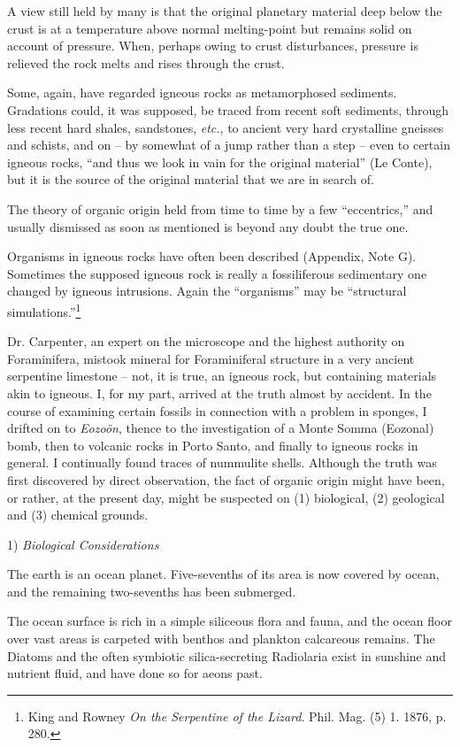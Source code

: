 \documentclass[a4paper, 12pt, oneside]{article}
\begin{document}
A view still held by many is that the original planetary material deep below the crust is at a temperature above normal melting-point but remains solid on account of pressure. When, perhaps owing to crust disturbances, pressure is relieved the rock melts and rises through the crust.

Some, again, have regarded igneous rocks as metamorphosed sediments. Gradations could, it was supposed, be traced from recent soft sediments, through less recent hard shales, sandstones, \emph{etc.}, to ancient very hard crystalline gneisses and schists, and on -- by somewhat of a jump rather than a step -- even to certain igneous rocks, ``and thus we look in vain for the original material'' (Le Conte), but it is the source of the original material that we are in search of.

The theory of organic origin held from time to time by a few ``eccentrics,'' and usually dismissed as soon as mentioned is beyond any doubt the true one.

Organisms in igneous rocks have often been described (Appendix, Note G). Sometimes the supposed igneous rock is really a fossiliferous sedimentary one changed by igneous intrusions. Again the ``organisms'' may be ``structural simulations.''\footnote{King and Rowney \emph{On the Serpentine of the Lizard}. Phil. Mag. (5) 1. 1876, p. 280.}

Dr. Carpenter, an expert on the microscope and the highest authority on Foraminifera, mistook mineral for Foraminiferal structure in a very ancient serpentine limestone -- not, it is true, an igneous rock, but containing materials akin to igneous. I, for my part, arrived at the truth almost by accident. In the course of examining certain fossils in connection with a problem in sponges, I drifted on to \emph{Eozoön}, thence to the investigation of a Monte Somma (Eozonal) bomb, then to volcanic rocks in Porto Santo, and finally to igneous rocks in general. I continually found traces of nummulite shells. Although the truth was first discovered by direct observation, the fact of organic origin might have been, or rather, at the present day, might be suspected on (1) biological, (2) geological and (3) chemical grounds.

1) \emph{Biological Considerations}

The earth is an ocean planet. Five-sevenths of its area is now covered by ocean, and the remaining two-sevenths has been submerged.

The ocean surface is rich in a simple siliceous flora and fauna, and the ocean floor over vast areas is carpeted with benthos and plankton calcareous remains. The Diatoms and the often symbiotic silica-secreting Radiolaria exist in sunshine and nutrient fluid, and have done so for aeons past.
\end{document}
